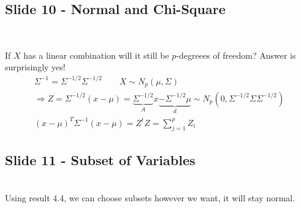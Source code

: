 \subsection{Slide 10 - Normal and Chi-Square}\hfill\\
\par\bigskip
\noindent If $X$ has a linear combination will it still be $p$-degreees of freedom? Answer is surprisingly yes!
\begin{equation*}
  \begin{gathered}
    \Sigma^{-1} = \Sigma^{-1/2}\Sigma^{-1/2}\qquad X\sim N_p(\mu,\Sigma)\\
    \Rightarrow Z = \Sigma^{-1/2}(x-\mu) = \underbrace{\Sigma^{-1/2}}_{\text{$A$}}x\underbrace{-\Sigma^{-1/2}\mu}_{\text{$d$}}\sim N_p(0,\Sigma^{-1/2}\Sigma\Sigma^{-1/2})\\
    (x-\mu)^T\Sigma^{-1}(x-\mu) = Z^tZ=\sum_{j=1}^{p}Z_i
  \end{gathered}
\end{equation*}
\par\bigskip
\subsection{Slide 11 - Subset of Variables}\hfill\\
\noindent Using result 4.4, we can choose subsets however we want, it will stay normal.
\par\bigskip
